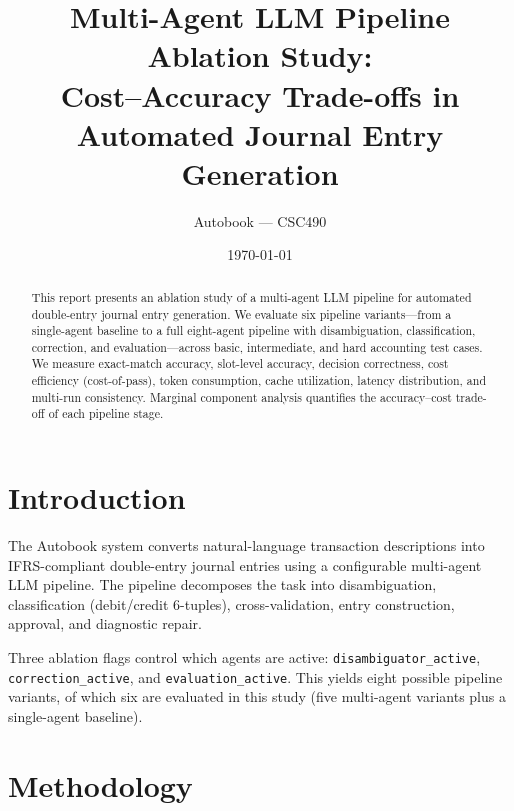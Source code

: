 \documentclass[11pt, a4paper]{article}
\title{%
  Multi-Agent LLM Pipeline Ablation Study:\\
  Cost--Accuracy Trade-offs in Automated Journal Entry Generation%
}
\author{Autobook --- CSC490}
\date{\today}
\begin{document}
\maketitle

\begin{abstract}
This report presents an ablation study of a multi-agent LLM pipeline for
automated double-entry journal entry generation. We evaluate six pipeline
variants---from a single-agent baseline to a full eight-agent pipeline with
disambiguation, classification, correction, and evaluation---across basic,
intermediate, and hard accounting test cases. We measure exact-match accuracy,
slot-level accuracy, decision correctness, cost efficiency (cost-of-pass),
token consumption, cache utilization, latency distribution, and multi-run
consistency. Marginal component analysis quantifies the accuracy--cost
trade-off of each pipeline stage.
\end{abstract}

\tableofcontents
\newpage

\section{Introduction}

The Autobook system converts natural-language transaction descriptions into
IFRS-compliant double-entry journal entries using a configurable multi-agent
LLM pipeline. The pipeline decomposes the task into disambiguation,
classification (debit/credit 6-tuples), cross-validation, entry construction,
approval, and diagnostic repair.

Three ablation flags control which agents are active:
\texttt{disambiguator\_active}, \texttt{correction\_active}, and
\texttt{evaluation\_active}. This yields eight possible pipeline variants,
of which six are evaluated in this study (five multi-agent variants plus a
single-agent baseline).

\section{Methodology}
\end{document}
